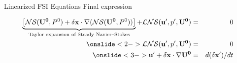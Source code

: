 \begin{frame}[t]{Linearized FSI Equations}
	{Final expression}
	
	\normalsize
	\begin{eqnarray}
	\underbrace{\left[\mathcal{NS}(\mathbf{U^{0}},P^{0}) + \mathbf{ \delta x}\cdot\nabla(\mathcal{NS}\mathbf{(U^{0}},P^{0} ))\right]}_{\text{Taylor expansion of Steady Navier--Stokes}} + \mathcal{LNS}(\mathbf{ u'},p',\mathbf{U^{0}}) &=& 0 \nonumber \\
	\onslide<2-> \mathcal{LNS}(\mathbf{ u'},p',\mathbf{U^{0}}) &=& 0 \nonumber \\
	\onslide<3-> \mathbf{ u'} + \mathbf{ \delta x}\cdot\nabla\mathbf{U^{0}}  &=& d\mathbf{(\delta x')}/dt 		\nonumber
	\end{eqnarray}

	
\end{frame}


